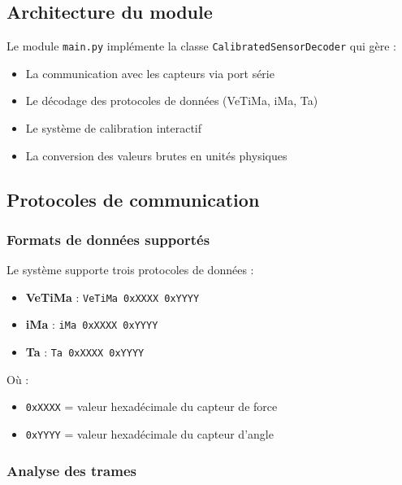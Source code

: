 \documentclass[12pt,a4paper]{article}
\begin{document}
\subsection{Architecture du module}

Le module \texttt{main.py} implémente la classe \texttt{CalibratedSensorDecoder} qui gère :
\begin{itemize}
    \item La communication avec les capteurs via port série
    \item Le décodage des protocoles de données (VeTiMa, iMa, Ta)
    \item Le système de calibration interactif
    \item La conversion des valeurs brutes en unités physiques
\end{itemize}

\subsection{Protocoles de communication}

\subsubsection{Formats de données supportés}

Le système supporte trois protocoles de données :

\begin{codebox}
\begin{itemize}
    \item \textbf{VeTiMa} : \texttt{VeTiMa 0xXXXX 0xYYYY}
    \item \textbf{iMa} : \texttt{iMa 0xXXXX 0xYYYY}
    \item \textbf{Ta} : \texttt{Ta 0xXXXX 0xYYYY}
\end{itemize}
\end{codebox}

Où :
\begin{itemize}
    \item \texttt{0xXXXX} = valeur hexadécimale du capteur de force
    \item \texttt{0xYYYY} = valeur hexadécimale du capteur d'angle
\end{itemize}

\subsubsection{Analyse des trames}
\end{document}
